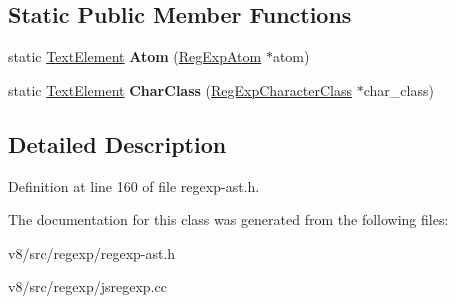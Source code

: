 \subsection*{Static Public Member Functions}
\begin{DoxyCompactItemize}
\item 
\mbox{\label{classv8_1_1internal_1_1TextElement_acef4e6726f3d5c7eadd3daddc7473710}} 
static \mbox{\hyperlink{classv8_1_1internal_1_1TextElement}{Text\+Element}} {\bfseries Atom} (\mbox{\hyperlink{classv8_1_1internal_1_1RegExpAtom}{Reg\+Exp\+Atom}} $\ast$atom)
\item 
\mbox{\label{classv8_1_1internal_1_1TextElement_a93d89823d2910691e627afe12c882995}} 
static \mbox{\hyperlink{classv8_1_1internal_1_1TextElement}{Text\+Element}} {\bfseries Char\+Class} (\mbox{\hyperlink{classv8_1_1internal_1_1RegExpCharacterClass}{Reg\+Exp\+Character\+Class}} $\ast$char\+\_\+class)
\end{DoxyCompactItemize}


\subsection{Detailed Description}


Definition at line 160 of file regexp-\/ast.\+h.



The documentation for this class was generated from the following files\+:\begin{DoxyCompactItemize}
\item 
v8/src/regexp/regexp-\/ast.\+h\item 
v8/src/regexp/jsregexp.\+cc\end{DoxyCompactItemize}
